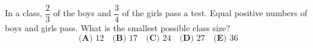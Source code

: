 In a class, $\dfrac{2}{3}$ of the boys and $\dfrac{3}{4}$ of the girls pass a test. Equal positive numbers of boys and girls pass. What is the smallest possible class size?
\[\textbf{(A) }12\quad\textbf{(B) }17\quad\textbf{(C) }24\quad\textbf{(D) }27\quad\textbf{(E) }36\]
